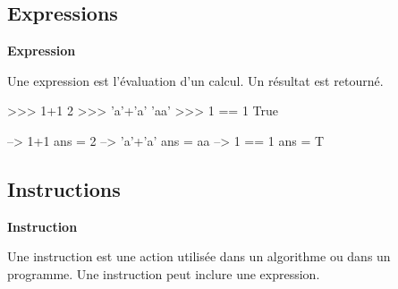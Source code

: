 \documentclass[10pt,fleqn]{article} %
\begin{document}
\subsection{Expressions}

\begin{defi}
\textbf{Expression}

Une expression est l'évaluation d'un calcul. Un résultat est retourné. 
\end{defi}

\begin{minipage}[c]{.45\linewidth}
\begin{py}
\begin{python}
>>> 1+1
	2
>>> 'a'+'a'
	'aa'
>>> 1 == 1
	True
\end{python}
\end{py}
\end{minipage}\hfill
\begin{minipage}[c]{.45\linewidth}
\begin{sci}
\begin{scilab}
--> 1+1
	ans = 2
--> 'a'+'a'
	ans = aa
--> 1 == 1
	ans = T
\end{scilab}
\end{sci}
\end{minipage}


\subsection{Instructions}


\begin{defi}
\textbf{Instruction}

Une instruction est une action utilisée dans un algorithme ou dans un programme. Une instruction peut inclure une expression.
\end{defi}
\end{document}
